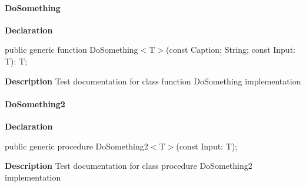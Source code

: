 \documentclass{report}
\newif\ifpdf
\begin{document}
\paragraph*{DoSomething}\hspace*{\fill}

\label{ok_generic_routines.TTestClass-DoSomething}
\begin{list}{}{
\setlength{\itemindent}{0cm}
\setlength{\listparindent}{0cm}
\setlength{\leftmargin}{\evensidemargin}
\addtolength{\leftmargin}{\tmplength}
\settowidth{\labelsep}{X}
\addtolength{\leftmargin}{\labelsep}
\setlength{\labelwidth}{\tmplength}
}
\item[\textbf{Declaration}\hfill]
\ifpdf
\begin{flushleft}
\fi
\begin{ttfamily}
public generic function DoSomething{$<$}T{$>$}(const Caption: String; const Input: T): T;\end{ttfamily}

\ifpdf
\end{flushleft}
\fi

\par
\item[\textbf{Description}]
Test documentation for class function DoSomething implementation

\end{list}
\paragraph*{DoSomething2}\hspace*{\fill}

\label{ok_generic_routines.TTestClass-DoSomething2}
\begin{list}{}{
\setlength{\itemindent}{0cm}
\setlength{\listparindent}{0cm}
\setlength{\leftmargin}{\evensidemargin}
\addtolength{\leftmargin}{\tmplength}
\settowidth{\labelsep}{X}
\addtolength{\leftmargin}{\labelsep}
\setlength{\labelwidth}{\tmplength}
}
\item[\textbf{Declaration}\hfill]
\ifpdf
\begin{flushleft}
\fi
\begin{ttfamily}
public generic procedure DoSomething2{$<$}T{$>$}(const Input: T);\end{ttfamily}

\ifpdf
\end{flushleft}
\fi

\par
\item[\textbf{Description}]
Test documentation for class procedure DoSomething2 implementation

\end{list}
\end{document}
